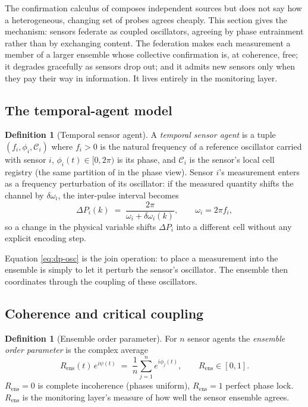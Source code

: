 \documentclass[11pt,a4paper,twocolumn]{article}
\theoremstyle{thmstyle}
\theoremstyle{definition}
\newtheorem{definition}[theorem]{Definition}
\theoremstyle{remark}
\newcommand{\Cs}{\mathcal{C}}
\newcommand{\DP}{\Delta P}
\newcommand{\Rens}{R_{\mathrm{ens}}}
\begin{document}
The confirmation calculus of  composes independent
sources but does not say how a heterogeneous, changing set of probes
agrees cheaply. This section gives the mechanism: sensors federate as
coupled oscillators, agreeing by phase entrainment rather than by
exchanging content. The federation makes each measurement a member of a
larger ensemble whose collective confirmation is, at coherence, free; it
degrades gracefully as sensors drop out; and it admits new sensors only
when they pay their way in information. It lives entirely in the
monitoring layer.

\subsection{The temporal-agent model}

\begin{definition}[Temporal sensor agent]
\label{def:agent}
A \emph{temporal sensor agent} is a tuple $(f_i,\phi_i,\Cs_i)$ where
$f_i>0$ is the natural frequency of a reference oscillator carried with
sensor $i$, $\phi_i(t)\in[0,2\pi)$ is its phase, and $\Cs_i$ is the
sensor's local cell registry (the same partition of 
in the phase view). Sensor $i$'s measurement enters as a frequency
perturbation of its oscillator: if the measured quantity shifts the
channel by $\delta\omega_i$, the inter-pulse interval becomes
\begin{equation}
\label{eq:dp-osc}
\DP_i(k)\;=\;\frac{2\pi}{\omega_i+\delta\omega_i(k)},\qquad\omega_i=2\pi f_i,
\end{equation}
so a change in the physical variable shifts $\DP_i$ into a different cell
without any explicit encoding step.
\end{definition}

Equation \eqref{eq:dp-osc} is the join operation: to place a measurement
into the ensemble is simply to let it perturb the sensor's oscillator.
The ensemble then coordinates through the coupling of these oscillators.

\subsection{Coherence and critical coupling}

\begin{definition}[Ensemble order parameter]
\label{def:order}
For $n$ sensor agents the \emph{ensemble order parameter} is the complex
average
\begin{equation}
\label{eq:order}
\Rens(t)\,e^{i\psi(t)}\;=\;\frac1n\sum_{j=1}^{n}e^{i\phi_j(t)},
\qquad\Rens\in[0,1].
\end{equation}
$\Rens=0$ is complete incoherence (phases uniform), $\Rens=1$ perfect
phase lock. $\Rens$ is the monitoring layer's measure of how well the
sensor ensemble agrees.
\end{definition}
\end{document}

